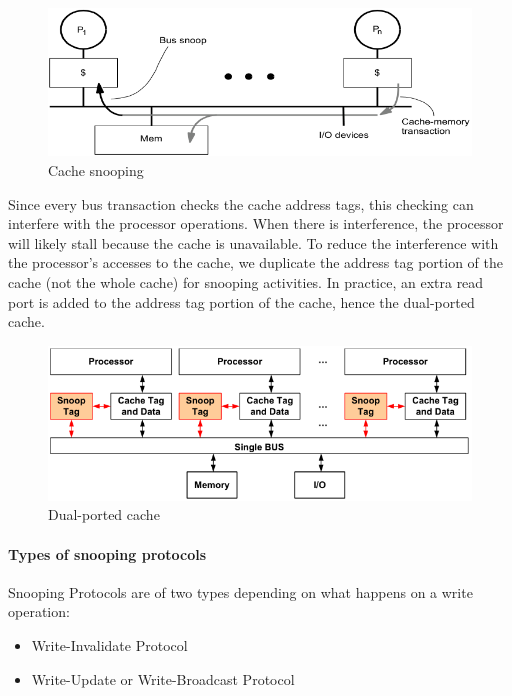 \begin{figure}[h]
    \centering
    \includegraphics[width=\linewidth]{images/cache-snooping-protocol}
    \caption{Cache snooping}
    \label{fig:cache-snooping}
\end{figure}

Since every bus transaction checks the cache
address tags, this checking can interfere with the
processor operations.
When there is interference, the processor will likely
stall because the cache is unavailable.
To reduce the interference with the processor’s
accesses to the cache, we duplicate the address
tag portion of the cache (not the whole cache) for
snooping activities.
In practice, an extra read port is added to the
address tag portion of the cache, hence the dual-ported cache.

\begin{figure}[h]
    \centering
    \includegraphics[width=\linewidth]{images/dual-ported-cache}
    \caption{Dual-ported cache}
    \label{fig:dual-ported-cache}
\end{figure}

\paragraph{Types of snooping protocols}
Snooping Protocols are of two types depending
on what happens on a write operation:
\begin{itemize}
    \item Write-Invalidate Protocol
    \item Write-Update or Write-Broadcast Protocol
\end{itemize}

